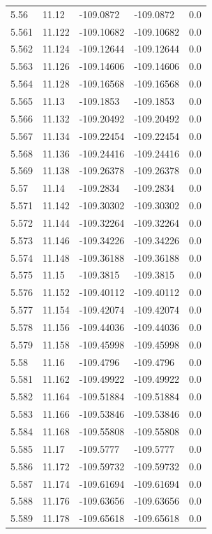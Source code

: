 \begin{tabular}{lllll}
5.56 & 11.12 & -109.0872 & -109.0872 & 0.0 \\
5.561 & 11.122 & -109.10682 & -109.10682 & 0.0 \\
5.562 & 11.124 & -109.12644 & -109.12644 & 0.0 \\
5.563 & 11.126 & -109.14606 & -109.14606 & 0.0 \\
5.564 & 11.128 & -109.16568 & -109.16568 & 0.0 \\
5.565 & 11.13 & -109.1853 & -109.1853 & 0.0 \\
5.566 & 11.132 & -109.20492 & -109.20492 & 0.0 \\
5.567 & 11.134 & -109.22454 & -109.22454 & 0.0 \\
5.568 & 11.136 & -109.24416 & -109.24416 & 0.0 \\
5.569 & 11.138 & -109.26378 & -109.26378 & 0.0 \\
5.57 & 11.14 & -109.2834 & -109.2834 & 0.0 \\
5.571 & 11.142 & -109.30302 & -109.30302 & 0.0 \\
5.572 & 11.144 & -109.32264 & -109.32264 & 0.0 \\
5.573 & 11.146 & -109.34226 & -109.34226 & 0.0 \\
5.574 & 11.148 & -109.36188 & -109.36188 & 0.0 \\
5.575 & 11.15 & -109.3815 & -109.3815 & 0.0 \\
5.576 & 11.152 & -109.40112 & -109.40112 & 0.0 \\
5.577 & 11.154 & -109.42074 & -109.42074 & 0.0 \\
5.578 & 11.156 & -109.44036 & -109.44036 & 0.0 \\
5.579 & 11.158 & -109.45998 & -109.45998 & 0.0 \\
5.58 & 11.16 & -109.4796 & -109.4796 & 0.0 \\
5.581 & 11.162 & -109.49922 & -109.49922 & 0.0 \\
5.582 & 11.164 & -109.51884 & -109.51884 & 0.0 \\
5.583 & 11.166 & -109.53846 & -109.53846 & 0.0 \\
5.584 & 11.168 & -109.55808 & -109.55808 & 0.0 \\
5.585 & 11.17 & -109.5777 & -109.5777 & 0.0 \\
5.586 & 11.172 & -109.59732 & -109.59732 & 0.0 \\
5.587 & 11.174 & -109.61694 & -109.61694 & 0.0 \\
5.588 & 11.176 & -109.63656 & -109.63656 & 0.0 \\
5.589 & 11.178 & -109.65618 & -109.65618 & 0.0 \\

\end{tabular}
